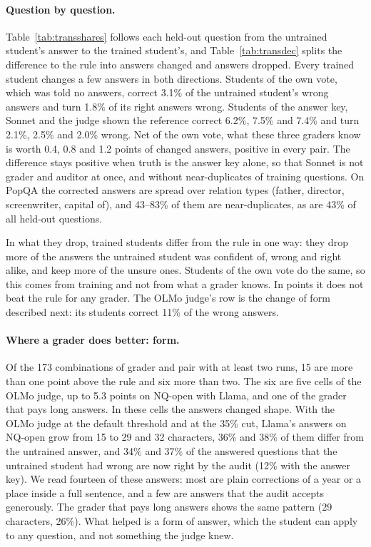 \documentclass[11pt,a4paper,twocolumn]{article}
\begin{document}
\paragraph{Question by question.} Table~\ref{tab:transshares} follows each held-out question from the untrained student's answer to the trained student's, and Table~\ref{tab:transdec} splits the difference to the rule into answers changed and answers dropped. Every trained student changes a few answers in both directions. Students of the own vote, which was told no answers, correct 3.1\% of the untrained student's wrong answers and turn 1.8\% of its right answers wrong. Students of the answer key, Sonnet and the judge shown the reference correct 6.2\%, 7.5\% and 7.4\% and turn 2.1\%, 2.5\% and 2.0\% wrong. Net of the own vote, what these three graders know is worth 0.4, 0.8 and 1.2 points of changed answers, positive in every pair. The difference stays positive when truth is the answer key alone, so that Sonnet is not grader and auditor at once, and without near-duplicates of training questions. On PopQA the corrected answers are spread over relation types (father, director, screenwriter, capital of), and 43--83\% of them are near-duplicates, as are 43\% of all held-out questions.

In what they drop, trained students differ from the rule in one way: they drop more of the answers the untrained student was confident of, wrong and right alike, and keep more of the unsure ones. Students of the own vote do the same, so this comes from training and not from what a grader knows. In points it does not beat the rule for any grader. The OLMo judge's row is the change of form described next: its students correct 11\% of the wrong answers.

\paragraph{Where a grader does better: form.} Of the 173 combinations of grader and pair with at least two runs, 15 are more than one point above the rule and six more than two. The six are five cells of the OLMo judge, up to 5.3 points on NQ-open with Llama, and one of the grader that pays long answers. In these cells the answers changed shape. With the OLMo judge at the default threshold and at the 35\% cut, Llama's answers on NQ-open grow from 15 to 29 and 32 characters, 36\% and 38\% of them differ from the untrained answer, and 34\% and 37\% of the answered questions that the untrained student had wrong are now right by the audit (12\% with the answer key). We read fourteen of these answers: most are plain corrections of a year or a place inside a full sentence, and a few are answers that the audit accepts generously. The grader that pays long answers shows the same pattern (29 characters, 26\%). What helped is a form of answer, which the student can apply to any question, and not something the judge knew.
\end{document}
